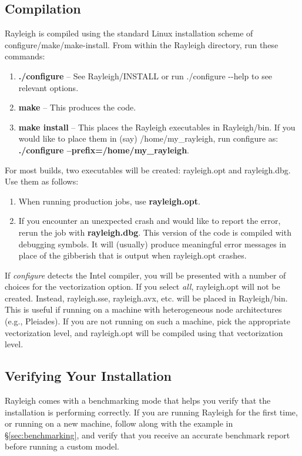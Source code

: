 \subsection{Compilation}
Rayleigh is compiled using the standard Linux installation scheme of configure/make/make-install.  From within the Rayleigh directory, run these commands:
\begin{enumerate}
\item \textbf{./configure}  -- See Rayleigh/INSTALL or run ./configure {-{}-}help to see relevant options.
\item \textbf{make} -- This produces the code.
\item \textbf{make install}  -- This places the Rayleigh executables in Rayleigh/bin.   If you would like to place them in (say) /home/my\_rayleigh, run configure as: \textbf{./configure --prefix=/home/my\_rayleigh}.
\end{enumerate}
For most builds, two executables will be created:  rayleigh.opt and rayleigh.dbg.  Use them as follows:
\begin{enumerate}
\item When running production jobs, use \textbf{rayleigh.opt}.
\item If you encounter an unexpected crash and would like to report the error, rerun the job with \textbf{rayleigh.dbg}.  This version of the code is compiled with debugging symbols.  It will (usually) produce meaningful error messages in place of the gibberish that is output when rayleigh.opt crashes.
\end{enumerate}

If \textit{configure} detects the Intel compiler, you will be presented with a number of choices for the vectorization option.  If you select \textit{all}, rayleigh.opt will not be created.  Instead, rayleigh.sse, rayleigh.avx, etc. will be placed in Rayleigh/bin.  This is useful if running on a machine with heterogeneous node architectures (e.g., Pleiades).  If you are not running on such a machine, pick the appropriate vectorization level, and rayleigh.opt will be compiled using that vectorization level.

\subsection{Verifying Your Installation}
Rayleigh comes with a benchmarking mode that helps you verify that the installation is performing correctly.  If you are running Rayleigh for the first time, or running on a new machine, follow along with the example in \S \ref{sec:benchmarking}, and verify that you receive an accurate benchmark report before running a custom model.
